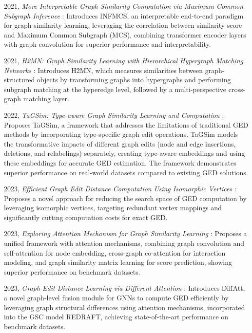\documentclass[../Thesis.tex]{subfiles}
\begin{document}
	2021, \textit{More Interpretable Graph Similarity Computation via Maximum Common Subgraph Inference} \cite{more_interpretable_graph_similarity_computation_via_maximum_common_subgraph_inference}: Introduces INFMCS, an interpretable end-to-end paradigm for graph similarity learning, leveraging the correlation between similarity score and Maximum Common Subgraph (MCS), combining transformer encoder layers with graph convolution for superior performance and interpretability.
	
	2021, \textit{H2MN: Graph Similarity Learning with Hierarchical Hypergraph Matching Networks} \cite{h2mn__graph_similarity_learning_with_hierarchical_hypergraph_matching_networks}: Introduces H2MN, which measures similarities between graph-structured objects by transforming graphs into hypergraphs and performing subgraph matching at the hyperedge level, followed by a multi-perspective cross-graph matching layer.
	
	2022, \textit{TaGSim: Type-aware Graph Similarity Learning and Computation} \cite{TaGSim_type_aware_graph_similarity_learning_and_computation}: Proposes TaGSim, a framework that addresses the limitations of traditional GED methods by incorporating type-specific graph edit operations. TaGSim models the transformative impacts of different graph edits (node and edge insertions, deletions, and relabelings) separately, creating type-aware embeddings and using these embeddings for accurate GED estimation. The framework demonstrates superior performance on real-world datasets compared to existing GED solutions.
	
	2023, \textit{Efficient Graph Edit Distance Computation Using Isomorphic Vertices} \cite{efficient_graph_edit_distance_computation_using_isomorphic_vertices}: Proposes a novel approach for reducing the search space of GED computation by leveraging isomorphic vertices, targeting redundant vertex mappings and significantly cutting computation costs for exact GED.
	
	2023, \textit{Exploring Attention Mechanism for Graph Similarity Learning} \cite{exploring_attention_mechanism_for_graph_similarity_learning}: Proposes a unified framework with attention mechanisms, combining graph convolution and self-attention for node embedding, cross-graph co-attention for interaction modeling, and graph similarity matrix learning for score prediction, showing superior performance on benchmark datasets.
	
	2023, \textit{Graph Edit Distance Learning via Different Attention} \cite{graph_edit_distance_learning_via_different_attention}: Introduces DiffAtt, a novel graph-level fusion module for GNNs to compute GED efficiently by leveraging graph structural differences using attention mechanisms, incorporated into the GSC model REDRAFT, achieving state-of-the-art performance on benchmark datasets.
	
\end{document}
